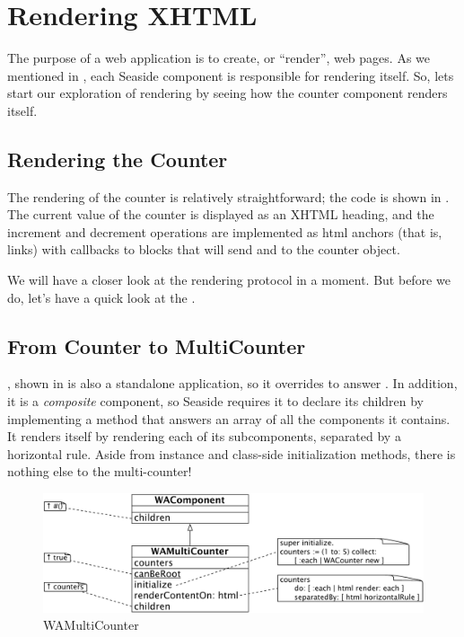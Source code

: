 \documentclass[a4paper,10pt,twoside]{book}
\begin{document}
\section{Rendering XHTML}

The purpose of a web application is to create, or ``render'', web pages.  As we mentioned in , each Seaside component is responsible for rendering itself.  
So, lets start our exploration of rendering by seeing how the counter component renders itself.

\subsection{Rendering the Counter}

The rendering of the counter is relatively straightforward; the code is shown in .
The current value of the counter is displayed as an XHTML heading, and the increment and decrement operations are implemented as html anchors (that is, links) with callbacks to blocks that will send  and  to the counter object.

We will have a closer look at the rendering protocol in a moment.
But before we do, let's have a quick look at the .

\subsection{From Counter to MultiCounter}

, shown in  is also a standalone application, so it overrides  to answer .
In addition, it is a \emph{composite} component, so Seaside requires it to declare its children by implementing a method  that answers an array of all the components it contains.
It renders itself by rendering each of its subcomponents, separated by a horizontal rule.
Aside from instance and class-side initialization methods, there is nothing else to the multi-counter!

\begin{figure}[bht]
\begin{center}
\includegraphics[width=\textwidth]{WAMultiCounter}
\caption{WAMultiCounter}
\end{center}
\end{figure}
\end{document}
